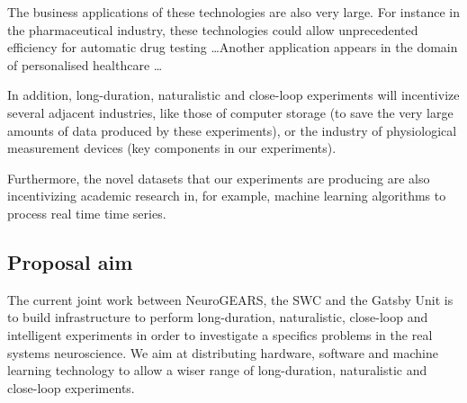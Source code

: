 The business applications of these technologies are also very large. For
instance in the pharmaceutical industry, these technologies could allow
unprecedented efficiency for automatic drug testing \ldots Another application
appears in the domain of personalised healthcare \ldots

In addition, long-duration, naturalistic and close-loop experiments will
incentivize several adjacent industries, like those of computer storage (to
save the very large amounts of data produced by these experiments), or the
industry of physiological measurement devices (key components in our
experiments).

Furthermore, the novel datasets that our experiments are producing are also
incentivizing academic research in, for example, machine learning algorithms to
process real time time series.

\subsection{Proposal aim}

The current joint work between NeuroGEARS, the SWC and the Gatsby Unit is to
build infrastructure to perform long-duration, naturalistic, close-loop and
intelligent experiments in order to investigate a specifics problems in the
real systems neuroscience. We aim at distributing hardware, software and
machine learning technology to allow a wiser range of long-duration,
naturalistic and close-loop experiments.
